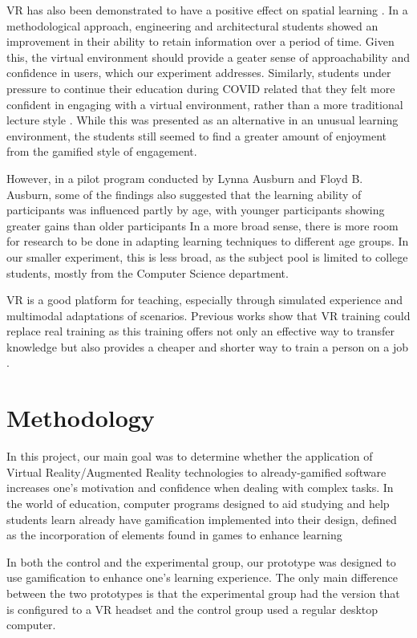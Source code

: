 \documentclass[manuscript,screen,review]{acmart}
\begin{document}
VR has also been demonstrated to have a positive effect on spatial learning \cite{molina2018virtual}. In a methodological approach, engineering and architectural students showed an improvement in their ability to retain information over a period of time. Given this, the virtual environment should provide a geater sense of approachability and confidence in users, which our experiment addresses. Similarly, students under pressure to continue their education during COVID related that they felt more confident in engaging with a virtual environment, rather than a more traditional lecture style \cite{perez2022can}. While this was presented as an alternative in an unusual learning environment, the students still seemed to find a greater amount of enjoyment from the gamified style of engagement.

However, in a pilot program conducted by Lynna Ausburn and Floyd B. Ausburn, some of the findings also suggested that the learning ability of participants was influenced partly by age, with younger participants showing greater gains than older participants \cite{ausburn2008effects} In a more broad sense, there is more room for research to be done in adapting learning techniques to different age groups. In our smaller experiment, this is less broad, as the subject pool is limited to college students, mostly from the Computer Science department.

VR is a good platform for teaching, especially through simulated experience and multimodal adaptations of scenarios. Previous works show that VR training could replace real training as this training offers not only an effective way to transfer knowledge but also provides a cheaper and shorter way to train a person on a job \cite{martin2022multimodality}. 

\section{Methodology}
In this project, our main goal was to determine whether the application of Virtual Reality/Augmented Reality technologies to already-gamified software increases one’s motivation and confidence when dealing with complex tasks. In the world of education, computer programs designed to aid studying and help students learn already have gamification implemented into their design, defined as the incorporation of elements found in games to enhance learning \cite{oberdorfer2021mutual} 

In both the control and the experimental group, our prototype was designed to use gamification to enhance one’s learning experience. The only main difference between the two prototypes is that the experimental group had the version that is configured to a VR headset and the control group used a regular desktop computer. 
\end{document}
